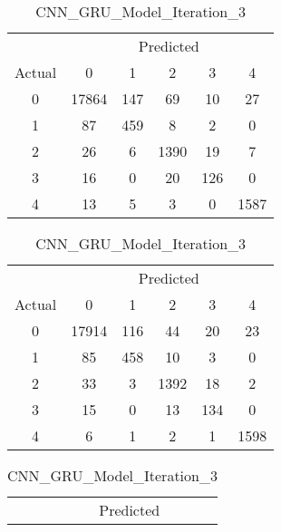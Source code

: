 \begin{table}[ht]
    \centering
    \caption{Confusion Matrices with Absolute Values}
    \label{tab:conf_abs_it3}
    \begin{minipage}{0.32\textwidth}
        \caption*{CNN\_Model\_Iteration\_3}
        \begin{tabular}{cccccc}
            \toprule
            & \multicolumn{5}{c}{Predicted} \\
            \cmidrule(lr){2-6}
            Actual & 0 & 1 & 2 & 3 & 4 \\
            \midrule
            0 & 17864 & 147 & 69  & 10  & 27  \\
            1 & 87    & 459 & 8   & 2   & 0   \\
            2 & 26    & 6   & 1390& 19  & 7   \\
            3 & 16    & 0   & 20  & 126 & 0   \\
            4 & 13    & 5   & 3   & 0   & 1587\\
            \bottomrule
        \end{tabular}
    \end{minipage}
    \hfill
    \begin{minipage}{0.32\textwidth}
        \caption*{CNN\_LSTM\_Model\_Iteration\_3}
        \begin{tabular}{cccccc}
            \toprule
            & \multicolumn{5}{c}{Predicted} \\
            \cmidrule(lr){2-6}
            Actual & 0 & 1 & 2 & 3 & 4 \\
            \midrule
            0 & 17914 & 116 & 44  & 20  & 23  \\
            1 & 85    & 458 & 10  & 3   & 0   \\
            2 & 33    & 3   & 1392& 18  & 2   \\
            3 & 15    & 0   & 13  & 134 & 0   \\
            4 & 6     & 1   & 2   & 1   & 1598\\
            \bottomrule
        \end{tabular}
    \end{minipage}
    \hfill
    \begin{minipage}{0.32\textwidth}
        \caption*{CNN\_GRU\_Model\_Iteration\_3}
        \begin{tabular}{cccccc}
            \toprule
            & \multicolumn{5}{c}{Predicted} \\

\end{tabular}
\end{minipage}
\end{table}
